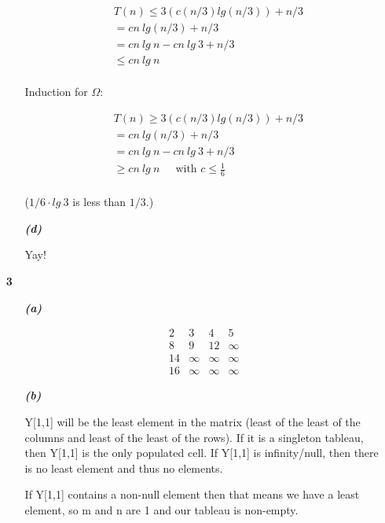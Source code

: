 \documentclass{article}
\begin{document}
\begin{enumerate}
\begin{enumerate}
		\begin{align*}
		& T(n) \leq 3(c(n/3)lg(n/3)) + n/3 \\
		& = cn\ lg(n/3) + n/3 \\
		& = cn\ lg\ n - cn\ lg\ 3 + n/3 \\
		& \leq cn\ lg\ n  \\
		\end{align*}

		Induction for $\Omega$:

		\begin{align*}
		& T(n) \geq 3(c(n/3)lg(n/3)) + n/3 \\
		& = cn\ lg(n/3) + n/3 \\
		& = cn\ lg\ n - cn\ lg\ 3 + n/3 \\
		& \geq cn\ lg\ n \ \ \ \ \ \text{ with $c \leq \frac{1}{6}$}\\
		\end{align*}

		($1/6 \cdot lg\ 3$  is less than $1/3$.)

		\item[\textbf{\emph{{(d)}}}]

		Yay!

	\end{enumerate}

\item[\textbf{3}]

	\begin{enumerate}

		\item[\textbf{\emph{{(a)}}}]

		\[ \begin{matrix}
		2 & 3 & 4 & 5\\
		8 & 9 & 12 & \infty \\
		14 & \infty & \infty & \infty  \\
		16 & \infty & \infty & \infty 
		\end{matrix} \]

		\item[\textbf{\emph{{(b)}}}]

		Y[1,1] will be the least element in the matrix (least of the least of the
		columns and least of the least of the rows). If it is a singleton tableau,
		then Y[1,1] is the only populated cell. If Y[1,1] is infinity/null, then
		there is no least element and thus no elements.

		If Y[1,1] contains a non-null element then that means we have a least
		element, so m and n are 1 and our tableau is non-empty.


\end{enumerate}
\end{enumerate}
\end{document}
